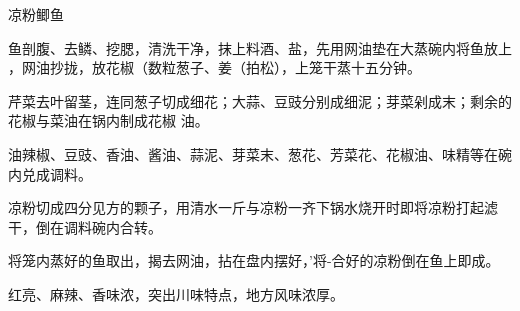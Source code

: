 \begin{recipe}{凉粉鲫鱼}

\ingredients


\cooking

\step 鱼剖腹、去鳞、挖腮，清洗干净，抹上料酒、盐，先用网油垫在大蒸碗内将鱼放上
，网油抄拢，放花椒（数粒葱子、姜（拍松），上笼干蒸十五分钟。

\step 芹菜去叶留茎，连同葱子切成细花；大蒜、豆豉分别成细泥；芽菜剁成末；剩余的
花椒与菜油在锅内制成花椒 油。

\step 油辣椒、豆豉、香油、酱油、蒜泥、芽菜末、葱花、芳菜花、花椒油、味精等在碗
内兑成调料。

\step 凉粉切成四分见方的颗子，用清水一斤与凉粉一齐下锅水烧开时即将凉粉打起滤
干，倒在调料碗内合转。

\step 将笼内蒸好的鱼取出，揭去网油，拈在盘内摆好，’将-合好的凉粉倒在鱼上即成。

\features

红亮、麻辣、香味浓，突出川味特点，地方风味浓厚。

\end{recipe}

